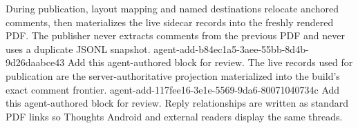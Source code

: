 During publication, layout mapping and named destinations relocate anchored comments, then  materializes the live sidecar records into the freshly rendered PDF.
The publisher never extracts comments from the previous PDF and never uses a duplicate  JSONL snapshot.
\agentProposedEdit
  {agent-add-b84ec1a5-3aee-55bb-8d4b-9d26daabce43}
  {Add this agent-authored block for review.}
  {}
  {The live records used for publication are the server-authoritative projection materialized into the build's exact comment frontier.}
\agentProposedEdit
  {agent-add-117fee16-3e1e-5569-9da6-80071040734c}
  {Add this agent-authored block for review.}
  {}
  {Reply relationships are written as standard PDF  links so Thoughts Android and external readers display the same threads.}

